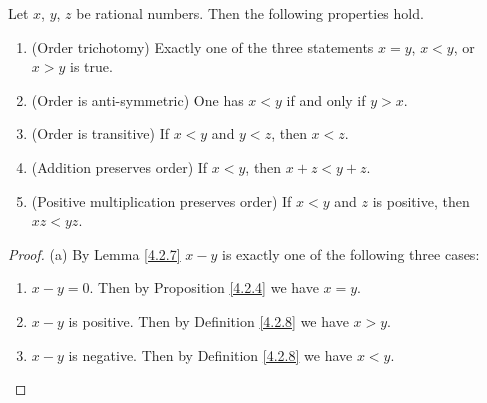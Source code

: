 \begin{proposition}\label{4.2.9}
    Let \(x\), \(y\), \(z\) be rational numbers.
    Then the following properties hold.
    \begin{enumerate}
        \item (Order trichotomy)
              Exactly one of the three statements \(x = y\), \(x < y\), or \(x > y\) is true.
        \item (Order is anti-symmetric)
              One has \(x < y\) if and only if \(y > x\).
        \item (Order is transitive)
              If \(x < y\) and \(y < z\), then \(x < z\).
        \item (Addition preserves order)
              If \(x < y\), then \(x + z < y + z\).
        \item (Positive multiplication preserves order)
              If \(x < y\) and \(z\) is positive, then \(xz < yz\).
    \end{enumerate}
\end{proposition}

\begin{proof}{(a)}
    By Lemma \ref{4.2.7} \(x - y\) is exactly one of the following three cases:
    \begin{enumerate}[label=(\Roman*)]
        \item \(x - y = 0\).
              Then by Proposition \ref{4.2.4} we have \(x = y\).
        \item \(x - y\) is positive.
              Then by Definition \ref{4.2.8} we have \(x > y\).
        \item \(x - y\) is negative.
              Then by Definition \ref{4.2.8} we have \(x < y\).
    \end{enumerate}
\end{proof}

